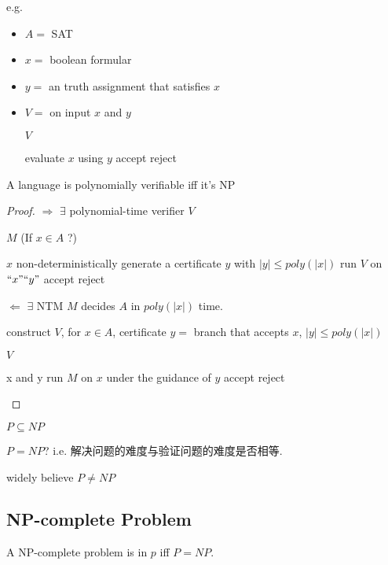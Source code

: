 e.g. 
\begin{itemize}
    \item $A=$ SAT
    \item $x=$ boolean formular
    \item $y=$ an truth assignment that satisfies $x$
    \item $V=$ on input $x$ and $y$
    \begin{algorithm}[H]
        \caption{$V$}
        \begin{algorithmic}
            \State evaluate $x$ using $y$
                \State accept
            \Else
                \State reject
            \EndIf
        \end{algorithmic}
    \end{algorithm}
\end{itemize}

\begin{theorem}
    A language is polynomially verifiable iff it's NP
\end{theorem}
\begin{proof}
    $\Rightarrow$ $\exists$ polynomial-time verifier $V$
    \begin{algorithm}[H]
        \caption{$M$ (If $x\in A$ ?)}
        \begin{algorithmic}
            \Require $x$
            \State non-deterministically generate a certificate $y$ with $|y|\le poly(|x|)$
            \State run $V$ on ${``x"}{``y"}$
                \State accept
            \Else
                \State reject
            \EndIf
        \end{algorithmic}
    \end{algorithm}
    
    $\Leftarrow$ $\exists$ NTM $M$ decides $A$ in $poly(|x|)$ time. 
    
    construct $V$, for $x\in A$, certificate $y=$ branch that accepts $x$, $|y|\le poly(|x|)$ 
    \begin{algorithm}[H]
        \caption{$V$}
        \begin{algorithmic}
            \Require x and y
            \State run $M$ on $x$ under the guidance of $y$
                \State accept
            \Else
                \State reject
            \EndIf
        \end{algorithmic}
    \end{algorithm}
\end{proof}

$P\subseteq NP$

$P= NP$? i.e. 解决问题的难度与验证问题的难度是否相等. 

widely believe $P\ne NP$

\subsection{NP-complete Problem}
\begin{definition}
    A NP-complete problem is in $p$ iff $P=NP$. 
\end{definition}